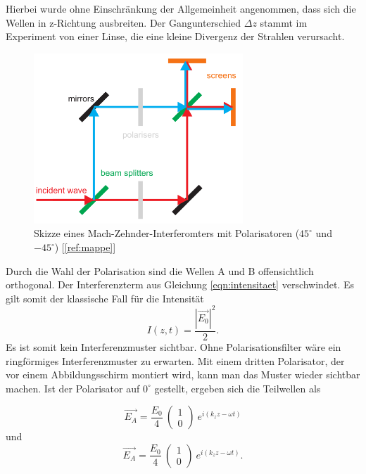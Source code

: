 \documentclass[a4paper,ngerman]{scrartcl}
\begin{document}
Hierbei wurde ohne Einschränkung der Allgemeinheit angenommen, dass sich die Wellen in z-Richtung ausbreiten. 
Der Gangunterschied $\Delta z$ stammt im Experiment von einer Linse, die eine kleine Divergenz der Strahlen verursacht.

\begin{figure}
\includegraphics[width=0.7\textwidth]{mach-zehnder.png}
\caption{Skizze eines Mach-Zehnder-Interferomters mit Polarisatoren ($45^{\circ}$ und $-45^{\circ}$) [\ref{ref:mappe}]}
\label{fig:mach-zehnder}
\end{figure}

Durch die Wahl der Polarisation sind die Wellen A und B offensichtlich orthogonal. Der Interferenzterm aus Gleichung \ref{eqn:intensitaet} verschwindet. Es gilt somit der klassische Fall für die Intensität
\begin{equation}
I(z,t) = \frac{|\vec{E_0}|^2}{2}.
\end{equation}
Es ist somit kein Interferenzmuster sichtbar. 
Ohne Polarisationsfilter wäre ein ringförmiges Interferenzmuster zu erwarten.
Mit einem dritten Polarisator, der vor einem Abbildungsschirm montiert wird, kann man das Muster wieder sichtbar machen. 
Ist der Polarisator auf $0^{\circ}$ gestellt, ergeben sich die Teilwellen als

\begin{equation}
\vec{E_A} = \frac{E_0}{4} \ \begin{pmatrix} 1\\ 0 \end{pmatrix} \ e^{i (k_z z -\omega t)}
\end{equation}
und
\begin{equation}
\vec{E_A} = \frac{E_0}{4} \ \begin{pmatrix} 1\\ 0 \end{pmatrix} \ e^{i (k_z z -\omega t)}.
\end{equation}
\end{document}
